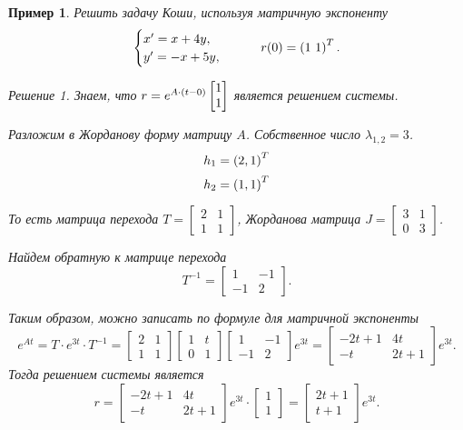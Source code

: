 \documentclass[a5paper, 11pt]{article}
\theoremstyle{definition}
\theoremstyle{plain}
\newtheorem{Ex}{Пример}
\theoremstyle{remark}
\newtheorem*{Solution}{Решение}
\begin{document}
	\begin{Ex}
		Решить задачу Коши, используя матричную экспоненту
		\[
		\begin{cases}
			x' = x+4y,\\
			y' = -x + 5y,
		\end{cases} \qquad r(0) = \left(1~1\right)^T.
		\]
		\begin{Solution}
			Знаем, что $r=e^{A \cdot \left(t-0\right)}\begin{bmatrix}
		1\\1
	\end{bmatrix}$ является решением системы.
	
	Разложим в Жорданову форму матрицу $A$. Собственное число $\lambda_{1,2} = 3$.
	\[
	 	h_1 = \left(2,1\right)^T
	\]
	\[
		h_2 = \left(1,1\right)^T
	\]
	
	 То есть матрица перехода $T = \begin{bmatrix}
	 	2 & 1 \\
	 	1 & 1
	 \end{bmatrix}$, Жорданова матрица $J = \begin{bmatrix}
	 3 & 1 \\ 0 & 3
 \end{bmatrix}$.

Найдем обратную к матрице перехода
	\[
	T^{-1} = \begin{bmatrix}
		1 & -1 \\
		-1 & 2
	\end{bmatrix}.
	\]
	
	Таким образом, можно записать по формуле для матричной экспоненты
	\[
	e^{At} = T \cdot e^{3t}\cdot T^{-1} = \begin{bmatrix}
		2 & 1 \\
		1 & 1
	\end{bmatrix}  \begin{bmatrix}
	1 & t \\ 0 & 1
\end{bmatrix} \begin{bmatrix}
1 & -1 \\
-1 & 2
\end{bmatrix}e^{3t} = \begin{bmatrix}
-2t+1 & 4t \\ -t & 2t+1
\end{bmatrix}e^{3t}.
	\]
	Тогда решением системы является 
	\[
	r = \begin{bmatrix}
		-2t+1 & 4t \\ -t & 2t+1
	\end{bmatrix}e^{3t} \cdot \begin{bmatrix}
	1\\1
\end{bmatrix} = \begin{bmatrix}
2t+1\\t+1
\end{bmatrix} e^{3t}.
	\]
		\end{Solution}
	\end{Ex}
\end{document}

